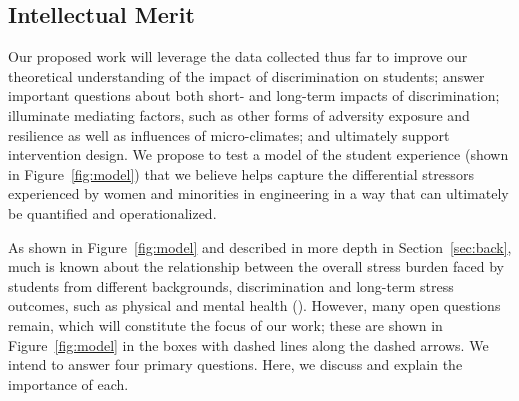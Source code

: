 
\subsection{Intellectual Merit}
\label{sec:questions}

Our proposed work will leverage the data collected thus far to improve our theoretical understanding of the impact of discrimination on students; answer important questions about both short- and long-term impacts of discrimination; illuminate mediating factors, such as other forms of adversity exposure and resilience as well as influences of micro-climates; and ultimately support intervention design.
We  propose to test a model of the student experience (shown in Figure~\ref{fig:model}) that we believe helps capture the differential stressors experienced by women and minorities in engineering in a way that can ultimately be quantified and operationalized. 


As shown in Figure~\ref{fig:model} and described in more depth in Section~\ref{sec:back}, much is known about the relationship between the overall stress burden faced by students from different backgrounds, discrimination and long-term stress outcomes, such as physical and mental health  (\eg \cite{Ong:2009}). However, many open questions remain, which will constitute the focus of our work; these are shown in Figure~\ref{fig:model} in the boxes with dashed lines along the dashed arrows. We intend to answer four primary questions. Here, we discuss and explain the importance of each.

